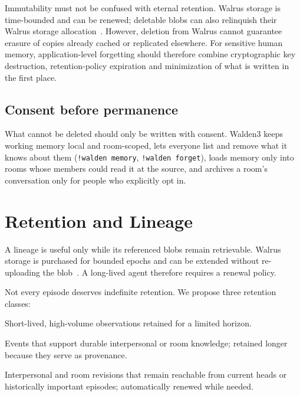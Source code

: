 \documentclass[11pt]{article}
\begin{document}
Immutability must not be confused with eternal retention. Walrus storage is time-bounded and can be renewed; deletable blobs can also relinquish their Walrus storage allocation~\cite{walrus-whitepaper,walrus-console}. However, deletion from Walrus cannot guarantee erasure of copies already cached or replicated elsewhere. For sensitive human memory, application-level forgetting should therefore combine cryptographic key destruction, retention-policy expiration and minimization of what is written in the first place.

\subsection{Consent before permanence}

What cannot be deleted should only be written with consent. Walden3 keeps working memory local and room-scoped, lets everyone list and remove what it knows about them (\texttt{!walden memory}, \texttt{!walden forget}), loads memory only into rooms whose members could read it at the source, and archives a room's conversation only for people who explicitly opt in.

\section{Retention and Lineage}

A lineage is useful only while its referenced blobs remain retrievable. Walrus storage is purchased for bounded epochs and can be extended without re-uploading the blob~\cite{walrus-whitepaper}. A long-lived agent therefore requires a renewal policy.

Not every episode deserves indefinite retention. We propose three retention classes:

\begin{description}[style=nextline]
\item[Working episodes]
Short-lived, high-volume observations retained for a limited horizon.

\item[Consolidated episodes]
Events that support durable interpersonal or room knowledge; retained longer because they serve as provenance.

\item[Identity lineage]
Interpersonal and room revisions that remain reachable from current heads or historically important episodes; automatically renewed while needed.
\end{description}
\end{document}
